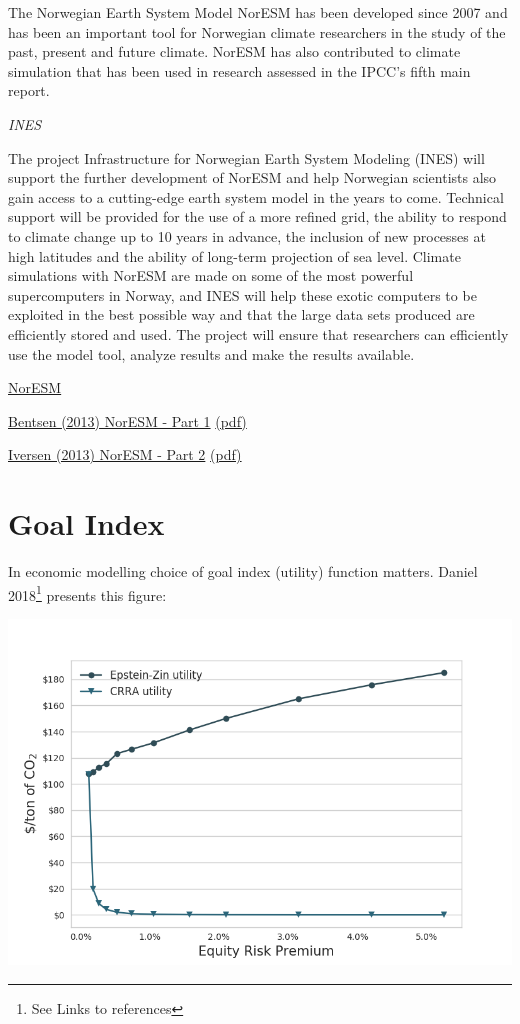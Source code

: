 \documentclass[
]{book}
\begin{document}
The Norwegian Earth System Model NorESM has been developed since 2007 and has been an important tool for Norwegian climate researchers in the study of the past, present and future climate. NorESM has also contributed to climate simulation that has been used in research assessed in the IPCC's fifth main report.

\emph{INES}

The project Infrastructure for Norwegian Earth System Modeling (INES) will support the further development of NorESM and help Norwegian scientists also gain access to a cutting-edge earth system model in the years to come. Technical support will be provided for the use of a more refined grid, the ability to respond to climate change up to 10 years in advance, the inclusion of new processes at high latitudes and the ability of long-term projection of sea level.
Climate simulations with NorESM are made on some of the most powerful supercomputers in Norway, and INES will help these exotic computers to be exploited in the best possible way and that the large data sets produced are efficiently stored and used. The project will ensure that researchers can efficiently use the model tool, analyze results and make the results available.

\href{https://www.noresm.org/}{NorESM}

\href{https://gmd.copernicus.org/articles/6/687/2013/}{Bentsen (2013) NorESM - Part 1}
\href{pdf/Bentsen_2013_NorESM_1.pdf}{(pdf)}

\href{https://gmd.copernicus.org/articles/6/389/2013/}{Iversen (2013) NorESM - Part 2}
\href{pdf/Iversen_2013_NorESM_2.pdf}{(pdf)}

\hypertarget{goal-index}{%
\section{Goal Index}\label{goal-index}}

In economic modelling choice of goal index (utility) function matters.
Daniel 2018\footnote{See Links to references} presents this figure:

\includegraphics{fig/fig_EZvsCRRA_daniel2018fig1.png}
\end{document}
